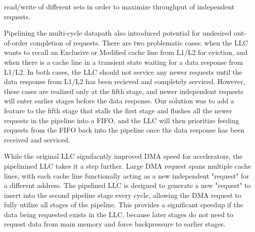 \documentclass{sig-alternate}
\begin{document}
read/write of different sets in order to maximize throughput of independent requests.
\par Pipelining the multi-cycle datapath also introduced potential for undesired out-of-order completion of requests. There are two problematic cases: when the LLC wants to recall an Exclusive or Modified 
cache line from L1/L2 for eviction, and when there is a cache line in a transient state waiting for a data response from L1/L2. In both cases, the LLC should not service any newer requests until the data response from L1/L2 has been 
recieved and completely serviced. However, these cases are realized only at the fifth stage, and newer independent requests will enter earlier stages before the data response. Our solution was to add a feature to the 
fifth stage that stalls the first stage and flushes all the newer requests in the pipeline into a FIFO, and the LLC will then prioritize feeding requests from the FIFO back into the pipeline 
once the data response has been received and serviced.
\par While the original LLC signifacntly improved DMA speed for accelerators, the pipelinined LLC takes it a step further. Large DMA request spans multiple cache lines, 
with each cache line functionally acting as a new independent "request" for a different address. The pipelined LLC is designed to generate a new "request" to insert into the second pipeline stage every cycle,  
allowing the DMA request to fully utilize all stages of the pipeline. This provides a significant speedup if the data 
being requested exists in the LLC, because later stages do not need to request data from main memory and force backpressure to earlier stages.


\end{document}
